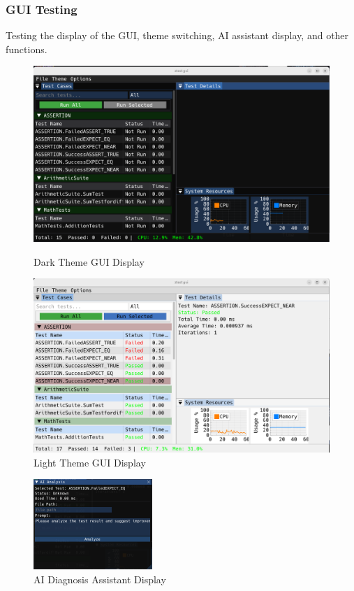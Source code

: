 \documentclass{article}
\begin{document}
\subsubsection{GUI Testing}
Testing the display of the GUI, theme switching, AI assistant display, and other functions.
\begin{figure}[H]
    \centering
    \begin{minipage}{0.5\textwidth}
        \includegraphics[width=\textwidth]{img/showgui.png}
        \caption{Dark Theme GUI Display}
        \label{fig:showgui}
    \end{minipage}%
    \begin{minipage}{0.5\textwidth}
        \includegraphics[width=\textwidth]{img/light.png}
        \caption{Light Theme GUI Display}
        \label{fig:light}
    \end{minipage}
\end{figure}
\begin{figure}[H]
    \centering
    \includegraphics[width=0.4\textwidth]{img/aih.png}
    \caption{AI Diagnosis Assistant Display}
    \label{fig: AI Diagnosis Assistant Display}
\end{figure}
\end{document}

